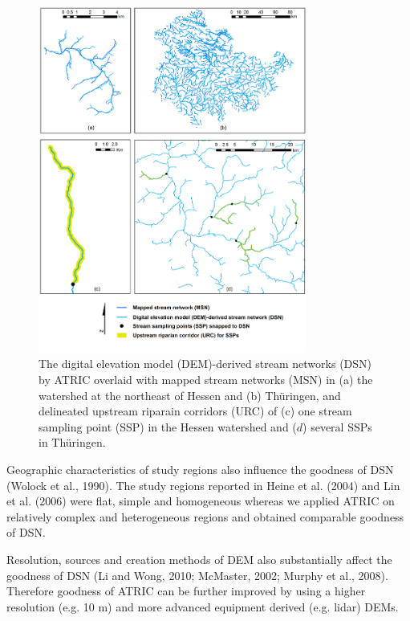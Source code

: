 \noindent\begin{figure}[h!]
  \centering
  \includegraphics[width=0.785\textwidth]{Figures/Fig_2_4.png}
  \caption{The digital elevation model (DEM)-derived stream networks (DSN) by ATRIC overlaid with mapped stream networks (MSN) in (a) the watershed at the northeast of Hessen and (b) Thüringen, and delineated upstream riparain corridors (URC) of (c) one stream sampling point (SSP) in the Hessen watershed and ($d$) several SSPs in Thüringen.}
  \label{Fig_2_4}
\end{figure}

Geographic characteristics of study regions also influence the goodness of DSN (Wolock et al., 1990). The study regions reported in Heine et al. (2004) and Lin et al. (2006) were flat, simple and homogeneous whereas we applied ATRIC on relatively complex and heterogeneous regions and obtained comparable goodness of DSN.

Resolution, sources and creation methods of DEM also substantially affect the goodness of DSN (Li and Wong, 2010; McMaster, 2002; Murphy et al., 2008). Therefore goodness of ATRIC can be further improved by using a higher resolution (e.g. 10 m) and more advanced equipment derived (e.g. lidar) DEMs.

\clearpage

\vspace{-1.1cm}

